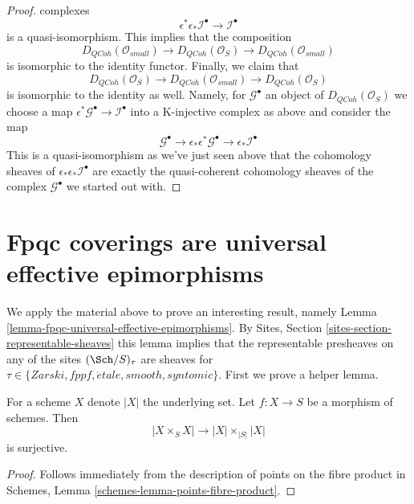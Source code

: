 \begin{proof}
complexes
$$
\epsilon^*\epsilon_*\mathcal{I}^\bullet \longrightarrow \mathcal{I}^\bullet
$$
is a quasi-isomorphism. This implies that the composition
$$
D_{QCoh}(\mathcal{O}_{small})
\longrightarrow
D_{QCoh}(\mathcal{O}_S)
\longrightarrow
D_{QCoh}(\mathcal{O}_{small})
$$
is isomorphic to the identity functor. Finally, we claim that
$$
D_{QCoh}(\mathcal{O}_S)
\longrightarrow
D_{QCoh}(\mathcal{O}_{small})
\longrightarrow
D_{QCoh}(\mathcal{O}_S)
$$
is isomorphic to the identity as well. Namely, for $\mathcal{G}^\bullet$
an object of $D_{QCoh}(\mathcal{O}_S)$ we choose a map
$\epsilon^*\mathcal{G}^\bullet \to \mathcal{I}^\bullet$
into a K-injective complex as above and consider the map
$$
\mathcal{G}^\bullet \to \epsilon_*\epsilon^*\mathcal{G}^\bullet \to
\epsilon_*\mathcal{I}^\bullet
$$
This is a quasi-isomorphism as we've just seen above that the cohomology
sheaves of $\epsilon_*\epsilon_*\mathcal{I}^\bullet$ are exactly the
quasi-coherent cohomology sheaves of the complex $\mathcal{G}^\bullet$
we started out with.
\end{proof}













\section{Fpqc coverings are universal effective epimorphisms}
\label{section-fpqc-universal-effective-epimorphisms}

\noindent
We apply the material above to prove an interesting result, namely
Lemma \ref{lemma-fpqc-universal-effective-epimorphisms}.
By Sites, Section \ref{sites-section-representable-sheaves}
this lemma implies that the representable
presheaves on any of the sites $(\Sch/S)_\tau$ are sheaves for
$\tau \in \{Zarski, fppf, \acute{e}tale, smooth, syntomic\}$. First
we prove a helper lemma.

\begin{lemma}
\label{lemma-equiv-fibre-product}
For a scheme $X$ denote $|X|$ the underlying set.
Let $f : X \to S$ be a morphism of schemes.
Then
$$
|X \times_S X| \to |X| \times_{|S|} |X|
$$
is surjective.
\end{lemma}

\begin{proof}
Follows immediately from the description of points on the
fibre product in Schemes, Lemma \ref{schemes-lemma-points-fibre-product}.
\end{proof}


